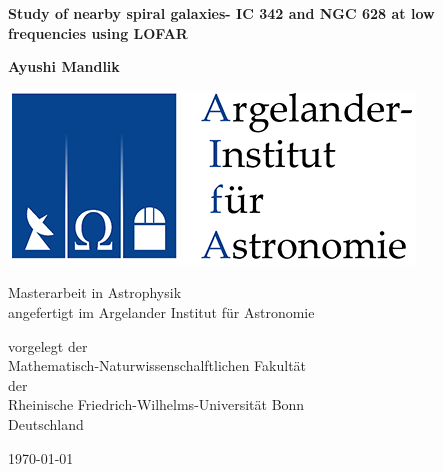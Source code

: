 \documentclass[a4paper, 10pt, twoside]{book}
\def\title{Study of nearby spiral galaxies- IC 342 and NGC 628 at low frequencies using LOFAR}
\def\thesisauthor{Ayushi Mandlik}
\begin{document}
    \frontmatter  %

    \begin{titlepage}
        \begin{center}
            \vspace{0.5cm}

            \Huge
            \textbf{\title}

            \vspace{0.5cm}
            \LARGE

            \vspace{1.5cm}

            \textbf{\thesisauthor}

            \vspace{4cm}

            \begin{center}
                \includegraphics{logo_aifa}
            \end{center}

            \vfill

            Masterarbeit in Astrophysik\\
            angefertigt im Argelander Institut f\"ur Astronomie

            \vspace{0.5cm}

            \Large
            vorgelegt der \\
            Mathematisch-Naturwissenschalftlichen Fakult\"at \\
            der \\
            Rheinische Friedrich-Wilhelms-Universit\"at Bonn\\
            Deutschland

            \vspace{0.5cm}

            \LARGE
            \today

        \end{center}
    \end{titlepage}
\end{document}
